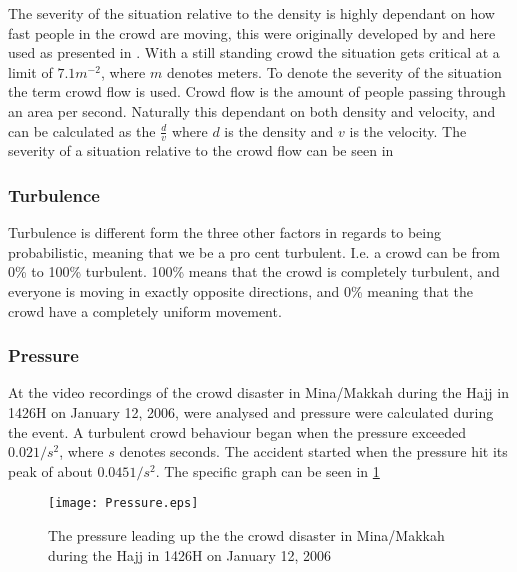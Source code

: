 The severity of the situation relative to the density is highly dependant on how fast people in the crowd are moving, this were originally developed by \citet{crowdDistasters} and here used as presented in \citet{wirz2013probing}. With a still standing crowd the situation gets critical at a limit of $7.1 m^{-2}$, where $m$ denotes meters. To denote the severity of the situation the term crowd flow is used. Crowd flow is the amount of people passing through an area per second. Naturally this dependant on both density and velocity, and can be calculated as the $\frac{d}{v}$ where $d$ is the density and $v$ is the velocity. The severity of a situation relative to the crowd flow can be seen in 
\citet{crowdDistasters}

\subsubsection{Turbulence}
Turbulence is different form the three other factors in regards to being probabilistic, meaning that we be a pro cent turbulent. I.e. a crowd can be from 0\% to 100\% turbulent. 100\% means that the crowd is completely turbulent, and everyone is moving in exactly opposite directions, and 0\% meaning that the crowd have a completely uniform movement.

\subsubsection{Pressure}
At \citet{empircalstudy} the video recordings of the crowd disaster in Mina/Makkah during the Hajj in 1426H on January 12, 2006, were analysed and pressure were calculated during the event. A turbulent crowd behaviour began when the pressure exceeded $0.02 1/s^2$, where $s$ denotes seconds. The accident started when the pressure hit its peak of about $0.045 1/s^2$. The specific graph can be seen in \cref{mekkahCrowdDistaster206}

\begin{figure}
    \centering
    \texttt{[image: Pressure.eps]}
    \caption{The pressure leading up the the crowd disaster in Mina/Makkah during the Hajj in 1426H on January 12, 2006 \cite{empircalstudy}}
    \label{mekkahCrowdDistaster206}
\end{figure}


